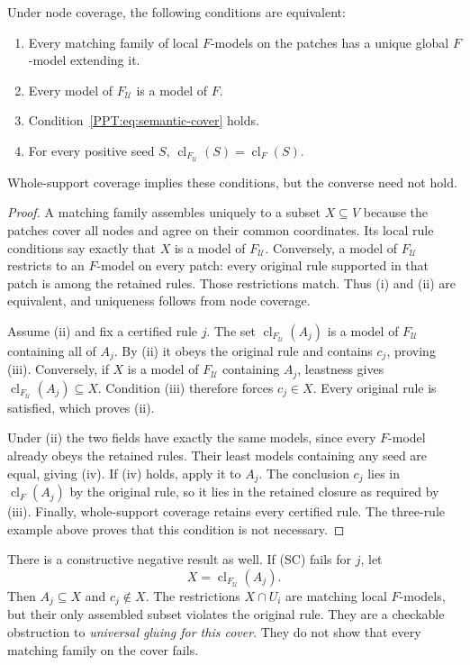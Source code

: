 \begin{PPTtheorem}
\label{PPT:res:new:semantic-cover}
Under node coverage, the following conditions are equivalent:
\begin{enumerate}[label=(\roman*)]
\item Every matching family of local $F$-models on the patches has a unique global $F$-model extending it.
\item Every model of $F_{\mathcal U}$ is a model of $F$.
\item Condition~\eqref{PPT:eq:semantic-cover} holds.
\item For every positive seed $S$, $\operatorname{cl}_{F_{\mathcal U}}(S)=\operatorname{cl}_F(S)$.
\end{enumerate}
Whole-support coverage implies these conditions, but the converse need not hold.
\end{PPTtheorem}
\begin{proof}
A matching family assembles uniquely to a subset $X\subseteq V$ because the patches cover all nodes and agree on their common coordinates. Its local rule conditions say exactly that $X$ is a model of $F_{\mathcal U}$. Conversely, a model of $F_{\mathcal U}$ restricts to an $F$-model on every patch: every original rule supported in that patch is among the retained rules. Those restrictions match. Thus (i) and (ii) are equivalent, and uniqueness follows from node coverage.

Assume (ii) and fix a certified rule $j$. The set $\operatorname{cl}_{F_{\mathcal U}}(A_j)$ is a model of $F_{\mathcal U}$ containing all of $A_j$. By (ii) it obeys the original rule and contains $c_j$, proving (iii). Conversely, if $X$ is a model of $F_{\mathcal U}$ containing $A_j$, leastness gives $\operatorname{cl}_{F_{\mathcal U}}(A_j)\subseteq X$. Condition (iii) therefore forces $c_j\in X$. Every original rule is satisfied, which proves (ii).

Under (ii) the two fields have exactly the same models, since every $F$-model already obeys the retained rules. Their least models containing any seed are equal, giving (iv). If (iv) holds, apply it to $A_j$. The conclusion $c_j$ lies in $\operatorname{cl}_F(A_j)$ by the original rule, so it lies in the retained closure as required by (iii). Finally, whole-support coverage retains every certified rule. The three-rule example above proves that this condition is not necessary.
\end{proof}

There is a constructive negative result as well. If (SC) fails for $j$, let
\[
 X=\operatorname{cl}_{F_{\mathcal U}}(A_j).
\]
Then $A_j\subseteq X$ and $c_j\notin X$. The restrictions $X\cap U_i$ are matching local $F$-models, but their only assembled subset violates the original rule. They are a checkable obstruction to \emph{universal gluing for this cover}. They do not show that every matching family on the cover fails.

